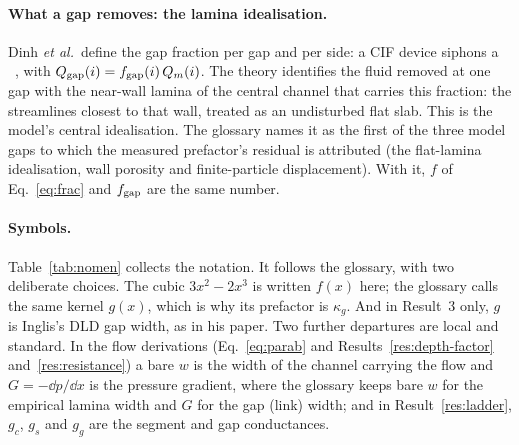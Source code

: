 \paragraph{What a gap removes: the lamina idealisation.} Dinh \emph{et al.}\ define the gap
fraction per gap and per side: a CIF device siphons a
~\cite[p.~915]{b5},
with $Q_{\mathrm{gap}}(i)=f_{\mathrm{gap}}(i)\,Q_m(i)$. The theory identifies the fluid removed at one
gap with the near-wall lamina of the central channel that carries this fraction: the
streamlines closest to that wall, treated as an undisturbed flat slab. This is the model's
central idealisation. The glossary names it as the first of the three model gaps to which
the measured prefactor's residual is attributed (the flat-lamina idealisation, wall porosity and
finite-particle displacement). With it, $f$ of Eq.~\eqref{eq:frac} and $f_{\mathrm{gap}}$ are the same
number.

\paragraph{Symbols.} Table~\ref{tab:nomen} collects the notation. It follows the glossary,
with two deliberate choices. The cubic $3x^2-2x^3$ is written $f(x)$ here; the glossary calls
the same kernel $g(x)$, which is why its prefactor is $\kappa_g$. And in Result~3 only, $g$ is
Inglis's DLD gap width, as in his paper. Two further departures are local and standard. In
the flow derivations (Eq.~\eqref{eq:parab} and Results~\ref{res:depth-factor}
and~\ref{res:resistance}) a bare $w$ is the width of the channel carrying the flow and
$G=-\dd p/\dd x$ is the pressure gradient, where the glossary keeps bare $w$ for the
empirical lamina width and $G$ for the gap (link) width; and in Result~\ref{res:ladder},
$g_c$, $g_s$ and $g_g$ are the segment and gap conductances.

